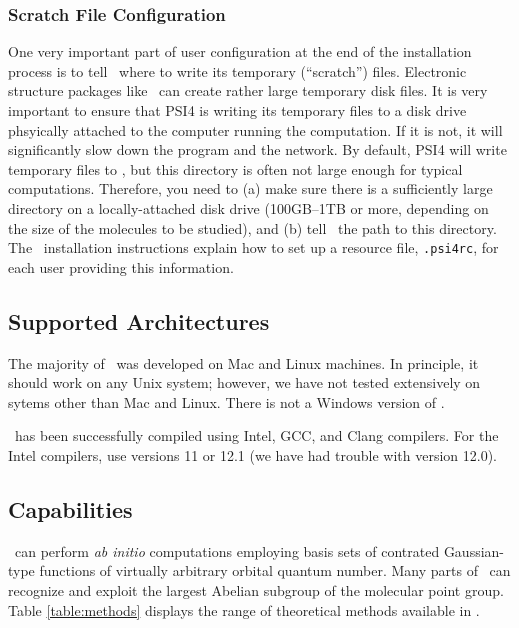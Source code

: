 \subsubsection{Scratch File Configuration}
One very important part of user configuration at the end of the
installation process is to tell \PSIfour\ where to write its temporary
(``scratch'') files.  Electronic structure packages like \PSIfour\ can
create rather large temporary disk files.  It is very important to 
ensure that PSI4 is writing its temporary files to a disk drive
phsyically attached to the computer running the computation.  If it
is not, it will significantly slow down the program and the network.
By default, PSI4 will write temporary files to , but this
directory is often not large enough for typical computations.  Therefore,
you need to (a) make sure there is a sufficiently large directory on a
locally-attached disk drive (100GB--1TB or more, depending on the size of
the molecules to be studied), and (b) tell \PSIfour\ the path to this
directory.  The \PSIfour\ installation instructions explain how to set up a
resource file, {\tt .psi4rc}, for each user providing this information.


\subsection{Supported Architectures}
The majority of \PSIfour\ was developed on Mac and Linux machines.  In
principle, it should work on any Unix system; however, we have not tested
extensively on sytems other than Mac and Linux.  There is not a Windows
version of \PSIfour.

\PSIfour\ has been successfully compiled using Intel, GCC, and Clang
compilers.  For the Intel compilers, use versions 11 or
12.1 (we have had trouble with version 12.0).  


\subsection{Capabilities}

\PSIfour\ can perform {\em ab initio} computations employing basis
sets of contrated Gaussian-type functions of virtually arbitrary
orbital quantum number.  Many parts of \PSIfour\ can recognize and
exploit the largest Abelian subgroup of the molecular point group.
Table \ref{table:methods} displays the range of theoretical methods
available in \PSIfour.

